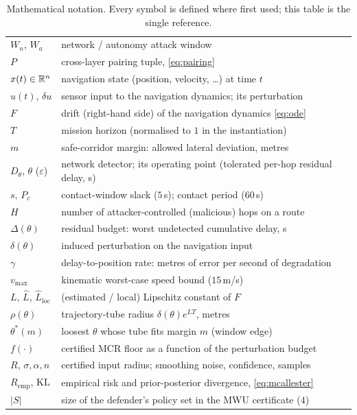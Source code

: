\begin{table}[t]
\centering
\caption{Mathematical notation. Every symbol is defined where first used;
this table is the single reference.}
\label{tab:notation}
\small
\renewcommand{\arraystretch}{1.05}
\begin{tabularx}{\columnwidth}{@{}lX@{}}
\toprule
$W_n$, $W_a$ & network / autonomy attack window\\
$P$ & cross-layer pairing tuple, \eqref{eq:pairing}\\
$x(t)\in\mathbb{R}^n$ & navigation state (position, velocity, \dots) at time $t$\\
$u(t)$, $\delta u$ & sensor input to the navigation dynamics; its perturbation\\
$F$ & drift (right-hand side) of the navigation dynamics \eqref{eq:ode}\\
$T$ & mission horizon (normalised to $1$ in the instantiation)\\
$m$ & safe-corridor margin: allowed lateral deviation, metres\\
$D_\theta$, $\theta$ ($\varepsilon$) & network detector; its operating point
(tolerated per-hop residual delay, s)\\
$s$, $P_{\!c}$ & contact-window slack ($5$\,s); contact period ($60$\,s)\\
$H$ & number of attacker-controlled (malicious) hops on a route\\
$\Delta(\theta)$ & residual budget: worst undetected cumulative delay, s\\
$\delta(\theta)$ & induced perturbation on the navigation input\\
$\gamma$ & delay-to-position rate: metres of error per second of degradation\\
$v_{\max}$ & kinematic worst-case speed bound ($15$\,m/s)\\
$L$, $\hat L$, $\hat L_{\mathrm{loc}}$ & (estimated / local) Lipschitz constant of $F$\\
$\rho(\theta)$ & trajectory-tube radius $\delta(\theta)e^{LT}$, metres\\
$\theta^{*}(m)$ & loosest $\theta$ whose tube fits margin $m$ (window edge)\\
$f(\cdot)$ & certified MCR floor as a function of the perturbation budget\\
$R$, $\sigma,\alpha,n$ & certified input radius; smoothing noise, confidence, samples\\
$R_{\mathrm{emp}}$, $\mathrm{KL}$ & empirical risk and prior-posterior divergence, \eqref{eq:mcallester}\\
$|S|$ & size of the defender's policy set in the MWU certificate ($4$)\\
\bottomrule
\end{tabularx}
\end{table}



